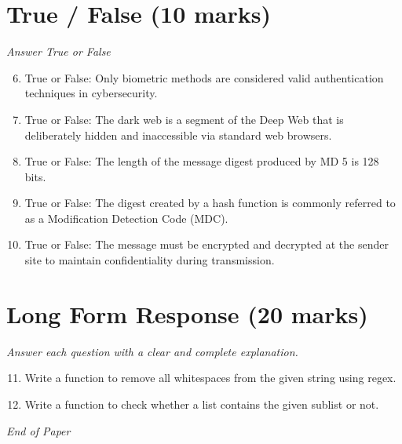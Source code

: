 \documentclass[12pt]{article}
\begin{document}
\section*{True / False (10 marks)}
\textit{Answer True or False}
\begin{enumerate}[label=\arabic*.]
\setcounter{enumi}{5}
\item True or False: Only biometric methods are considered valid authentication techniques in cybersecurity.
\item True or False: The dark web is a segment of the Deep Web that is deliberately hidden and inaccessible via standard web browsers.
\item True or False: The length of the message digest produced by MD 5 is 128 bits.
\item True or False: The digest created by a hash function is commonly referred to as a Modification Detection Code (MDC).
\item True or False: The message must be encrypted and decrypted at the sender site to maintain confidentiality during transmission.
\end{enumerate}

\section*{Long Form Response (20 marks)}
\textit{Answer each question with a clear and complete explanation.}
\begin{enumerate}[label=\arabic*.]
\setcounter{enumi}{10}
\item Write a function to remove all whitespaces from the given string using regex.
\item Write a function to check whether a list contains the given sublist or not.
\end{enumerate}

\vfill
\noindent\textit{End of Paper}
\end{document}
